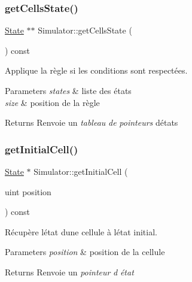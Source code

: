 \subsubsection{\texorpdfstring{get\+Cells\+State()}{getCellsState()}}
{\footnotesize\ttfamily \mbox{\hyperlink{class_state}{State}} $\ast$$\ast$ Simulator\+::get\+Cells\+State (\begin{DoxyParamCaption}{ }\end{DoxyParamCaption}) const}



Applique la règle si les conditions sont respectées. 


\begin{DoxyParams}{Parameters}
{\em states} & liste des états \\
\hline
{\em size} & position de la règle \\
\hline
\end{DoxyParams}
\begin{DoxyReturn}{Returns}
Renvoie un {\itshape tableau} {\itshape de} {\itshape pointeurs} d\textquotesingle{}états 
\end{DoxyReturn}
\mbox{\label{class_simulator_accbb3733fbb5722669b934fe4bde8dbf}} 
\subsubsection{\texorpdfstring{get\+Initial\+Cell()}{getInitialCell()}}
{\footnotesize\ttfamily \mbox{\hyperlink{class_state}{State}} $\ast$ Simulator\+::get\+Initial\+Cell (\begin{DoxyParamCaption}\item[{uint}]{position }\end{DoxyParamCaption}) const}



Récupère l\textquotesingle{}état d\textquotesingle{}une cellule à l\textquotesingle{}état initial. 


\begin{DoxyParams}{Parameters}
{\em position} & position de la cellule \\
\hline
\end{DoxyParams}
\begin{DoxyReturn}{Returns}
Renvoie un {\itshape pointeur} {\itshape d\textquotesingle{}} {\itshape état} 
\end{DoxyReturn}
\mbox{\label{class_simulator_a13bef7a120cba5b62fed4a89f0bc627a}} 
